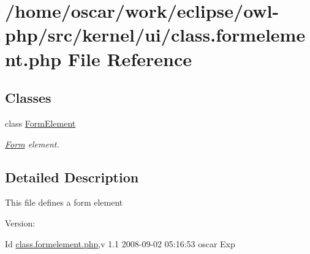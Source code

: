 \hypertarget{class_8formelement_8php}{
\section{/home/oscar/work/eclipse/owl-php/src/kernel/ui/class.formelement.php File Reference}
\label{class_8formelement_8php}
}
\subsection*{Classes}
\begin{CompactItemize}
\item 
class \hyperlink{classFormElement}{FormElement}
\begin{CompactList}\small\item\em \hyperlink{classForm}{Form} element. \item\end{CompactList}\end{CompactItemize}


\subsection{Detailed Description}
This file defines a form element \begin{Desc}
\item[Version:]\end{Desc}
\begin{Desc}
\item[Id]\hyperlink{class_8formelement_8php}{class.formelement.php},v 1.1 2008-09-02 05:16:53 oscar Exp \end{Desc}

